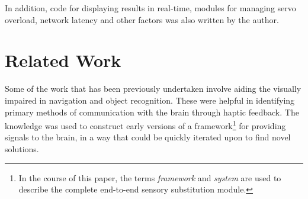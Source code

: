\documentclass[
12pt, %
oneside, %
english, %
doublespacing, %
headsepline, %
]{MastersDoctoralThesis} %
\begin{document}
In addition, code for displaying results in real-time, modules for managing servo overload, network latency and other factors was also written by the author.

\section{Related Work}

Some of the work that has been previously undertaken involve aiding the visually impaired in navigation and object recognition. These were helpful in identifying primary methods of communication with the brain through haptic feedback. The knowledge was used to construct early versions of a framework\footnote{In the course of this paper, the terms \textit{framework} and \textit{system} are used to describe the complete end-to-end sensory substitution module.} for providing signals to the brain, in a way that could be quickly iterated upon to find novel solutions.
\end{document}
